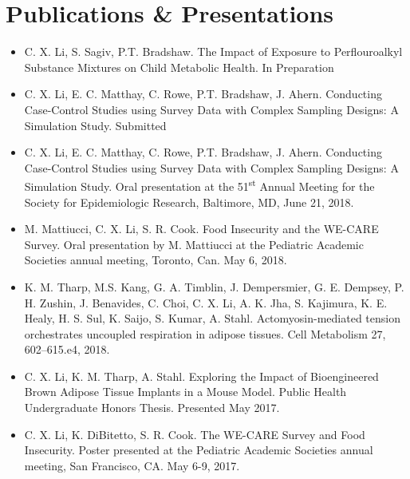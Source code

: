 
\section{Publications \& Presentations}
\begin{itemize}[leftmargin = 0cm]
\item [] { C. X. Li}, S. Sagiv, P.T. Bradshaw. The Impact of Exposure to Perflouroalkyl Substance Mixtures on Child Metabolic Health.  { In Preparation}
\item [] { C. X. Li}, E. C. Matthay, C. Rowe, P.T. Bradshaw, J. Ahern. Conducting Case-Control Studies using Survey Data with Complex Sampling Designs: A Simulation Study. { Submitted}
\item [] { C. X. Li}, E. C. Matthay, C. Rowe, P.T. Bradshaw, J. Ahern. Conducting Case-Control Studies using Survey Data with Complex Sampling Designs: A Simulation Study. Oral presentation at the 51\textsuperscript{st} Annual Meeting for the Society for Epidemiologic Research, Baltimore, MD, June 21, 2018.
\item []M. Mattiucci, { C. X. Li}, S. R. Cook. Food Insecurity and the WE-CARE Survey. Oral presentation by M. Mattiucci at the Pediatric Academic Societies annual meeting, Toronto, Can. May 6, 2018.
\item [] K. M. Tharp, M.S. Kang, G. A. Timblin, J. Dempersmier, G. E. Dempsey, P. H. Zushin, J. Benavides, C. Choi, { C. X. Li}, A. K. Jha, S. Kajimura, K. E. Healy, H. S. Sul, K. Saijo, S. Kumar, A. Stahl. Actomyosin-mediated tension orchestrates uncoupled respiration in adipose tissues. { Cell Metabolism} 27, 602–615.e4, 2018.
\item []{ C. X. Li}, K. M. Tharp, A. Stahl. Exploring the Impact of Bioengineered Brown Adipose Tissue Implants in a Mouse Model. Public Health Undergraduate Honors Thesis.  Presented May 2017.
\item []{ C. X. Li}, K. DiBitetto, S. R. Cook. The WE-CARE Survey and Food Insecurity. Poster presented at the Pediatric Academic Societies annual meeting, San Francisco, CA. May 6-9, 2017.

\end{itemize}


\sectionsep 